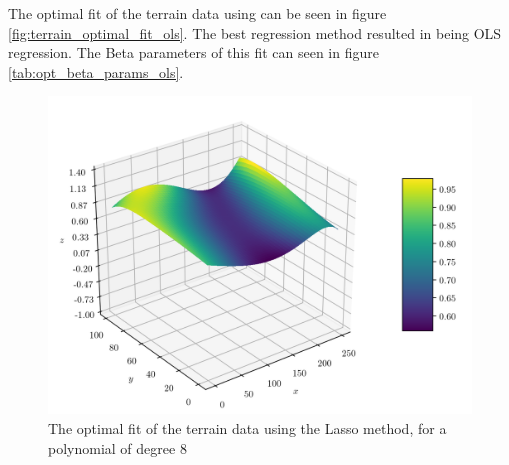 \documentclass[11pt]{article}
\begin{document}


The optimal fit of the terrain data using can be seen in figure \ref{fig:terrain_optimal_fit_ols}. The best regression method resulted in being OLS regression. The Beta parameters of this fit can seen in figure \ref{tab:opt_beta_params_ols}.

\begin{figure}[H]
    \centering
    \includegraphics[scale=0.8]{../fig/lasso_fit_deg8.png}
    \caption{The optimal fit of the terrain data using the Lasso method, for a polynomial of degree 8}
    \label{fig:terrain_optimal_fit_lasso}
\end{figure}
\end{document}
